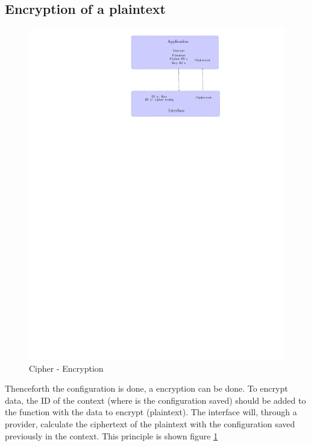 \newpage
\subsection*{Encryption of a plaintext}
\begin{figure}[!ht]
\centering
\includegraphics[trim=16cm 20cm 9.5cm 0cm]{figures/cipher_encrypt.pdf}
\caption{Cipher - Encryption\newline}
\label{fig:gci_cipher_encrypt}
\end{figure}
Thenceforth the configuration is done, a encryption can be done.\newline
To encrypt data, the ID of the context (where is the configuration saved)
should be added to the function with the data to encrypt (plaintext).\newline
The interface will, through a provider, calculate the ciphertext of the
plaintext with the configuration saved previously in the context.\newline
This principle is shown figure \ref{fig:gci_cipher_encrypt}
\newpage

